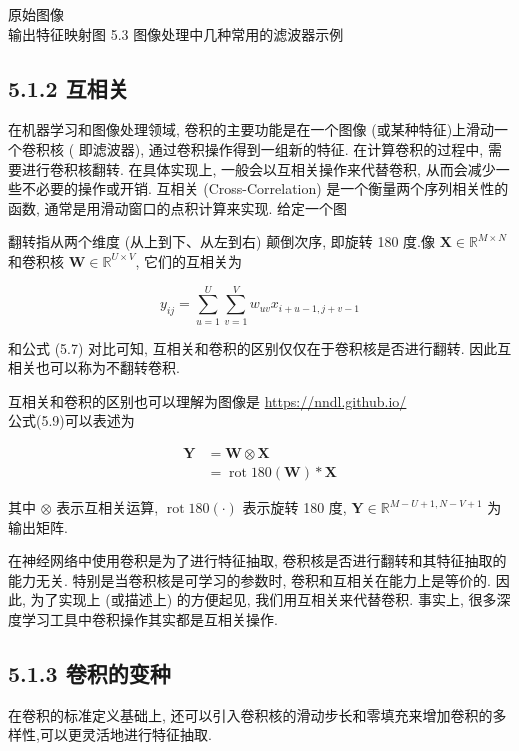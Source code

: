 \documentclass[10pt]{article}
\begin{document}
原始图像\\


输出特征映射图 5.3 图像处理中几种常用的滤波器示例

\subsection*{5.1.2 互相关}
在机器学习和图像处理领域, 卷积的主要功能是在一个图像 (或某种特征)上滑动一个卷积核 ( 即滤波器), 通过卷积操作得到一组新的特征. 在计算卷积的过程中, 需要进行卷积核翻转. 在具体实现上, 一般会以互相关操作来代替卷积, 从而会减少一些不必要的操作或开销. 互相关 (Cross-Correlation) 是一个衡量两个序列相关性的函数, 通常是用滑动窗口的点积计算来实现. 给定一个图

翻转指从两个维度 (从上到下、从左到右) 颠倒次序, 即旋转 180 度.像 $\boldsymbol{X} \in \mathbb{R}^{M \times N}$ 和卷积核 $\boldsymbol{W} \in \mathbb{R}^{U \times V}$, 它们的互相关为


\begin{equation*}
y_{i j}=\sum_{u=1}^{U} \sum_{v=1}^{V} w_{u v} x_{i+u-1, j+v-1} \tag{5.9}
\end{equation*}


和公式 (5.7) 对比可知, 互相关和卷积的区别仅仅在于卷积核是否进行翻转. 因此互相关也可以称为不翻转卷积.

互相关和卷积的区别也可以理解为图像是 \href{https://nndl.github.io/}{https://nndl.github.io/}\\
公式(5.9)可以表述为


\begin{align*}
\boldsymbol{Y} & =\boldsymbol{W} \otimes \boldsymbol{X}  \tag{5.10}\\
& =\operatorname{rot} 180(\boldsymbol{W}) * \boldsymbol{X} \tag{5.11}
\end{align*}


其中 $\otimes$ 表示互相关运算, $\operatorname{rot} 180(\cdot)$ 表示旋转 180 度, $\boldsymbol{Y} \in \mathbb{R}^{M-U+1, N-V+1}$ 为输出矩阵.

在神经网络中使用卷积是为了进行特征抽取, 卷积核是否进行翻转和其特征抽取的能力无关. 特别是当卷积核是可学习的参数时, 卷积和互相关在能力上是等价的. 因此, 为了实现上 (或描述上) 的方便起见, 我们用互相关来代替卷积. 事实上, 很多深度学习工具中卷积操作其实都是互相关操作.

\subsection*{5.1.3 卷积的变种}
在卷积的标准定义基础上, 还可以引入卷积核的滑动步长和零填充来增加卷积的多样性,可以更灵活地进行特征抽取.
\end{document}
